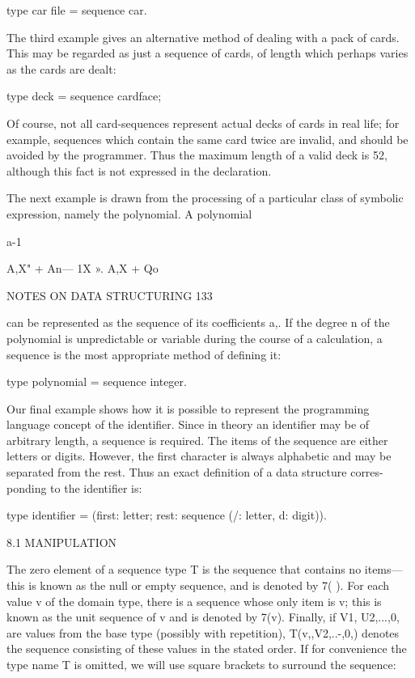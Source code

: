 {{{{				type car file = sequence car.
				
				The third example gives an alternative method of dealing with a pack of cards. This may be regarded as just a sequence of cards, of length which perhaps varies as the cards are dealt:
				
				type deck = sequence cardface;
				
				Of course, not all card-sequences represent actual decks of cards in real life; for example, sequences which contain the same card twice are invalid, and should be avoided by the programmer. Thus the maximum length of a valid deck is 52, although this fact is not expressed in the declaration.
				
				The next example is drawn from the processing of a particular class of symbolic expression, namely the polynomial. A polynomial
				
				a-1
				
				A,X" + An— 1X ». A,X + Qo
				
				NOTES ON DATA STRUCTURING 133
				
				can be represented as the sequence of its coefficients a,. If the degree n of the polynomial is unpredictable or variable during the course of a calculation, a sequence is the most appropriate method of defining it:
				
				type polynomial = sequence integer.
				
				Our final example shows how it is possible to represent the programming language concept of the identifier. Since in theory an identifier may be of arbitrary length, a sequence is required. The items of the sequence are either letters or digits. However, the first character is always alphabetic and may be separated from the rest. Thus an exact definition of a data structure corres- ponding to the identifier is:
				
				type identifier = (first: letter; rest: sequence (/: letter, d: digit)).
				
				8.1 MANIPULATION
				
				The zero element of a sequence type T is the sequence that contains no items— this is known as the null or empty sequence, and is denoted by 7( ). For each value v of the domain type, there is a sequence whose only item is v; this is known as the unit sequence of v and is denoted by 7(v). Finally, if V1, U2,...,0, are values from the base type (possibly with repetition), T(v,,V2,..-,0,) denotes the sequence consisting of these values in the stated order. If for convenience the type name T is omitted, we will use square brackets to surround the sequence:
				
}}}}

